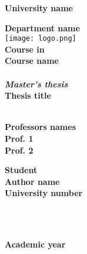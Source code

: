 \documentclass[11pt]{book}
\date{}
\begin{document}
	\begin{titlepage}
		\begin{center}
			\textbf{\huge University name}
			
			\hrulefill{}
			
			\textbf{\Large Department name}\\[3em]
			\texttt{[image: logo.png]}\\[4em] %
			\textbf{\Large Course in}\\[2em]
			\textbf{\Large Course name}\\[4em]
			\textbf{\textit{\Large}}\\[2em]
			\textbf{\Large \textit{Master's thesis}}\\[4em]
			\textbf{\huge Thesis title}\\[10em]
			\textbf{\textit{\Large }}\\[4em]
		\end{center}
		\begin{minipage}{0.46\textwidth}
			\begin{flushleft}
				\textbf{Professors names}\\[1.5em]
				\textbf{Prof. 1}\\[0.7em]
				\textbf{Prof. 2}\\[1.8em]
			\end{flushleft}
		\end{minipage}
		\hfill
		\begin{minipage}{0.46\textwidth}
			\begin{flushright}
				\textbf{Student}\\[2em]
				\textbf{Author name}\\[0.2em]
				\textbf{University number}\\[1.8em]
			\end{flushright}
		\end{minipage}\\[5,5em]
		\hfill
		\begin{center}
			\hrulefill{}\\
			\textbf{\large Academic year}
		\end{center}
	\end{titlepage}
\end{document}

